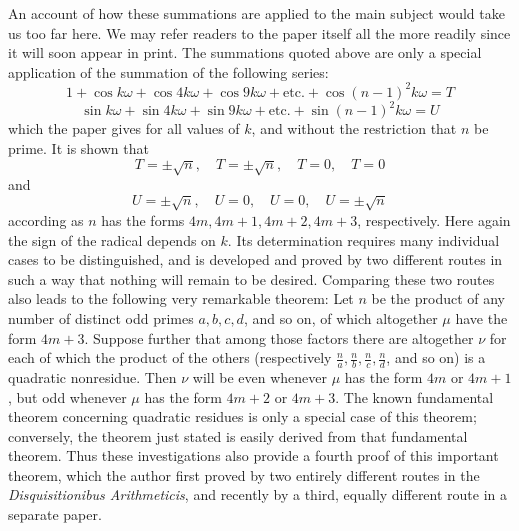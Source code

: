 An account of how these summations are applied to the main subject would take us too far here. We may refer readers to the paper itself all the more readily since it will soon appear in print. The summations quoted above are only a special application of the summation of the following series:
\[
1+\cos k\omega+\cos4k\omega+\cos9k\omega+\text{etc.}+\cos(n-1)^2k\omega=T
\]
\[
\sin k\omega+\sin4k\omega+\sin9k\omega+\text{etc.}+\sin(n-1)^2k\omega=U
\]
which the paper gives for all values of $k$, and without the restriction
%
that $n$ be prime. It is shown that
\[
T=\pm\surd n,\quad T=\pm\surd n,\quad T=0,\quad T=0
\]
and
\[
U=\pm\surd n,\quad U=0,\quad U=0,\quad U=\pm\surd n
\]
according as $n$ has the forms $4m,4m+1,4m+2,4m+3$, respectively. Here again the sign of the radical depends on $k$. Its determination requires many individual cases to be distinguished, and is developed and proved by two different routes in such a way that nothing will remain to be desired. Comparing these two routes also leads to the following very remarkable theorem: Let $n$ be the product of any number of distinct odd primes $a,b,c,d$, and so on, of which altogether $\mu$ have the form $4m+3$. Suppose further that among those factors there are altogether $\nu$ for each of which the product of the others (respectively $\frac na,\frac nb,\frac nc,\frac nd$, and so on) is a quadratic nonresidue. Then $\nu$ will be even whenever $\mu$ has the form $4m$ or $4m+1$, but odd whenever $\mu$ has the form $4m+2$ or $4m+3$. The known fundamental theorem concerning quadratic residues is only a special case of this theorem; conversely, the theorem just stated is easily derived from that fundamental theorem. Thus these investigations also provide a fourth proof of this important theorem, which the author first proved by two entirely different routes in the \emph{Disquisitionibus Arithmeticis}, and recently by a third, equally different route in a separate paper.
